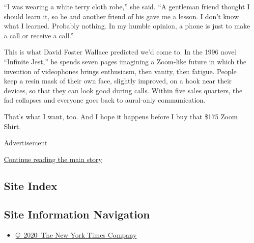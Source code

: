 ``I was wearing a white terry cloth robe,'' she said. ``A gentleman
friend thought I should learn it, so he and another friend of his gave
me a lesson. I don't know what I learned. Probably nothing. In my humble
opinion, a phone is just to make a call or receive a call.''

This is what David Foster Wallace predicted we'd come to. In the 1996
novel ``Infinite Jest,'' he spends seven pages imagining a Zoom-like
future in which the invention of videophones brings enthusiasm, then
vanity, then fatigue. People keep a resin mask of their own face,
slightly improved, on a hook near their devices, so that they can look
good during calls. Within five sales quarters, the fad collapses and
everyone goes back to aural-only communication.

That's what I want, too. And I hope it happens before I buy that \$175
Zoom Shirt.

Advertisement

\protect\hyperlink{after-bottom}{Continue reading the main story}

\hypertarget{site-index}{%
\subsection{Site Index}\label{site-index}}

\hypertarget{site-information-navigation}{%
\subsection{Site Information
Navigation}\label{site-information-navigation}}

\begin{itemize}
\tightlist
\item
  \href{https://help.nytimes3xbfgragh.onion/hc/en-us/articles/115014792127-Copyright-notice}{©~2020~The
  New York Times Company}
\end{itemize}

